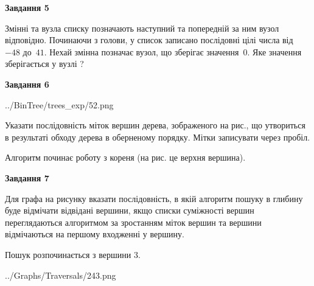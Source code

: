 \documentclass[12pt, ukrainian]{article}
\begin{document}
{\begin {large}
{\begin {center}\textbf{Завдання 5}\end {center}}\par
Змінні  та  вузла списку позначають наступний та попередній за ним вузол відповідно. Починаючи з голови, у список записано послідовні цілі числа від~$-48$ до~$41$. Нехай змінна  позначає вузол, що зберігає значення~$0$.
Яке значення зберігається у вузлі  ?\par
\newpage

{\begin {center}\textbf{Завдання 6}\end {center}}\par

\begin{center}
	{../BinTree/trees_exp/52.png}
\end{center}
Указати послідовність міток вершин дерева, зображеного на рис., що утвориться в результаті обходу дерева в оберненому порядку. Мітки записувати через пробіл.\par Алгоритм починає роботу з кореня (на рис. це верхня вершина).\par
\newpage

{\begin {center}\textbf{Завдання 7}\end {center}}\par
Для графа на рисунку вказати послідовність, в якій алгоритм пошуку в глибину буде відмічати відвідані вершини, якщо списки суміжності вершин переглядаються алгоритмом за зростанням міток вершин та вершини відмічаються на першому вход\-женні у вершину.\par
Пошук розпочинається з вершини 3.\par

\begin{center}
	{../Graphs/Traversals/243.png}
\end{center}\par
\newpage


\end{large}}
\end{document}
